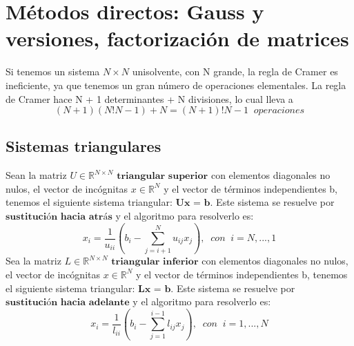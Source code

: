\section{Métodos directos: Gauss y versiones, factorización de matrices}
Si tenemos un sistema $N \times N$ unisolvente, con N grande, la regla de Cramer es ineficiente, ya que tenemos un gran número de operaciones elementales. La regla de Cramer hace N + 1 determinantes + N divisiones, lo cual lleva a
\[ (N+1)(N!N-1)+N = (N+1)!N-1 \; \; operaciones \]

\subsection{Sistemas triangulares}
Sean la matriz $U \in \mathbb{R}^{N \times N}$ $\textbf{triangular superior}$ con elementos diagonales no nulos, el vector de incógnitas $x \in \mathbb{R}^N$ y el vector de términos independientes b, tenemos el siguiente sistema triangular: $\textbf{Ux = b}$. Este sistema se resuelve por $\textbf{sustitución hacia atrás}$ y el algoritmo para resolverlo es:
\[ x_i = \frac{1}{u_{ii}} \left( b_i - \sum _{j=i+1}^N u_{ij}x_j \right), \; \; con \; \; i = N,...,1 \]
Sea la matriz $L \in \mathbb{R}^{N \times N}$  $\textbf{triangular inferior}$ con elementos diagonales no nulos, el vector de incógnitas $x \in \mathbb{R}^N$ y el vector de términos independientes b, tenemos el siguiente sistema triangular: $\textbf{Lx = b}$. Este sistema se resuelve por $\textbf{sustitución hacia adelante}$ y el algoritmo para resolverlo es:
\[ x_i = \frac{1}{l_{ii}} \left( b_i - \sum _{j=1}^{i-1} l_{ij}x_j \right), \; \; con \; \; i = 1,...,N \]

